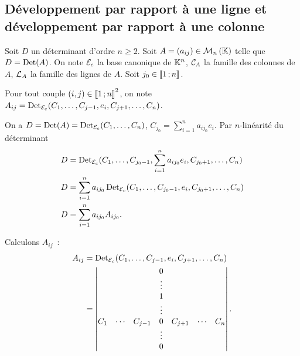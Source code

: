 \subsection{Développement par rapport à une ligne et développement par
rapport à une colonne}

Soit \(D\) un déterminant d'ordre \(n\geqslant 2\). Soit \(A=(a_{ij}) \in
\mathcal{M}_{n}\left(\mathbb{K}\right)\) telle que \(D=\operatorname{Det}(A)\). On note \(\mathcal{E}_c\) la base canonique
de \(\mathbb{K}^n\), \(\mathcal{C}_A\) la famille des colonnes de \(A\), \(\mathcal{L}_A\) la
famille des lignes de \(A\). Soit \(j_0 \in \mathopen{\llbracket}1\mathclose{}\mathpunct{};n\mathclose{\rrbracket}\).

Pour tout couple \((i,j) \in \mathopen{\llbracket}1\mathclose{}\mathpunct{};n\mathclose{\rrbracket}^2\), on note
\(A_{ij}=\operatorname{Det}_{\mathcal{E}_c}(C_1, \ldots, C_{j-1}, e_i, C_{j+1}, \ldots, C_n)\).

On a \(D=\operatorname{Det}(A) = \operatorname{Det}_{\mathcal{E}_c}(C_1, \ldots, C_n)\), \(C_{j_0}=\sum_{i=1}^n
a_{ij_{0}}e_i\). Par \(n\)-linéarité du déterminant
\begin{align}
  D &= \operatorname{Det}_{\mathcal{E}_c}(C_1, \ldots, C_{j_0-1}, \sum_{i=1}^n a_{ij_{0}}e_i,
  C_{j_0+1}, \ldots, C_n) \\
  D &= \sum_{i=1}^n a_{ij_{0}} \operatorname{Det}_{\mathcal{E}_c}(C_1, \ldots, C_{j_0-1}, e_i,
  C_{j_0+1}, \ldots, C_n) \\
D &= \sum_{i=1}^n a_{ij_{0}} A_{ij_0}. \end{align}

Calculons \(A_{ij}\)~:
\begin{align}
  A_{ij} &= \operatorname{Det}_{\mathcal{E}_c}(C_1, \ldots, C_{j-1}, e_i, C_{j+1}, \ldots, C_n)
  \\
  &=
  \begin{vmatrix}
        &        &         &0      &         &        &  \\
        &        &         &\vdots &         &        &  \\
        &        &         & 1     &         &        &  \\
        &        &         &\vdots &         &        &  \\
    C_1 & \cdots & C_{j-1} & 0     & C_{j+1} & \cdots & C_{n} \\
        &        &         &\vdots &         &        &  \\
        &        &         &0      &         &        &
  \end{vmatrix}.
\end{align}

